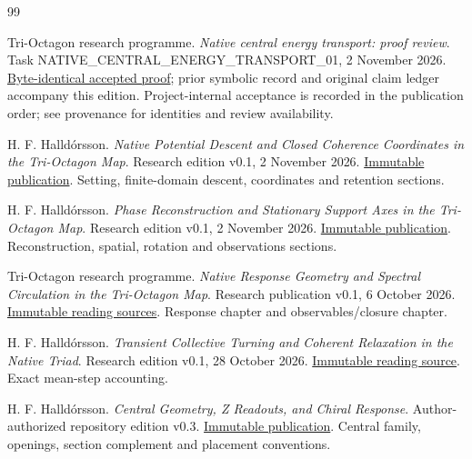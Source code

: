 \begin{thebibliography}{99}\small\raggedright
{} Tri-Octagon research programme.
\emph{Native central energy transport: proof review}. Task NATIVE\_CENTRAL\_ENERGY\_TRANSPORT\_01, 2 November 2026.
\href{evidence/accepted_proof.md}{Byte-identical accepted proof}; prior symbolic record and original claim ledger accompany this edition. Project-internal acceptance is recorded in the publication order; see provenance for identities and review availability.

 H. F. Halld\'orsson.
\emph{Native Potential Descent and Closed Coherence Coordinates in the Tri-Octagon Map}. Research edition v0.1, 2 November 2026.
\href{https://github.com/pzychozen/trioctagon-physics/tree/634ff13b666604d5caed11cc3731dcb5a863ff6c/papers/NATIVE_POTENTIAL_AND_CLOSED_COHERENCE/publication/v0.1}{Immutable publication}. Setting, finite-domain descent, coordinates and retention sections.

 H. F. Halld\'orsson.
\emph{Phase Reconstruction and Stationary Support Axes in the Tri-Octagon Map}. Research edition v0.1, 2 November 2026.
\href{https://github.com/pzychozen/trioctagon-physics/tree/c881b682ef6a8128dd1dc316d1850b9aeb1e1c8b/papers/PHASE_RECONSTRUCTION_AND_STATIONARY_SUPPORT_AXES/publication/v0.1}{Immutable publication}. Reconstruction, spatial, rotation and observations sections.

 Tri-Octagon research programme.
\emph{Native Response Geometry and Spectral Circulation in the Tri-Octagon Map}. Research publication v0.1, 6 October 2026.
\href{https://github.com/pzychozen/trioctagon-physics/tree/c881b682ef6a8128dd1dc316d1850b9aeb1e1c8b/papers/NATIVE_RESPONSE_GEOMETRY/manuscript}{Immutable reading sources}. Response chapter and observables/closure chapter.

 H. F. Halld\'orsson.
\emph{Transient Collective Turning and Coherent Relaxation in the Native Triad}. Research edition v0.1, 28 October 2026.
\href{https://github.com/pzychozen/trioctagon-physics/blob/c881b682ef6a8128dd1dc316d1850b9aeb1e1c8b/papers/COLLECTIVE_TURNING_AND_COHERENT_RELAXATION/v0.1/main.tex}{Immutable reading source}. Exact mean-step accounting.

 H. F. Halld\'orsson.
\emph{Central Geometry, Z Readouts, and Chiral Response}. Author-authorized repository edition v0.3.
\href{https://github.com/pzychozen/trioctagon-physics/tree/c881b682ef6a8128dd1dc316d1850b9aeb1e1c8b/papers/CENTRAL_GEOMETRY_Z_CHIRAL_RESPONSE/publication/v0.3}{Immutable publication}. Central family, openings, section complement and placement conventions.


\end{thebibliography}
